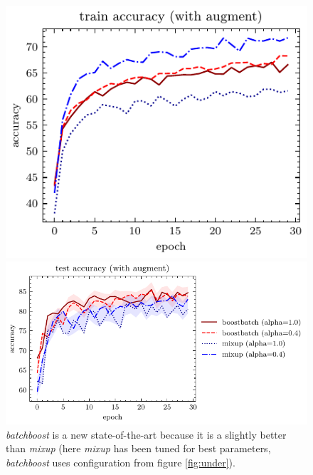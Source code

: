\documentclass{article}
\begin{document}
\begin{figure}[H]
  \centering
\begin{minipage}{.3\textwidth}
  \hspace{-0.65cm}
  \includegraphics[totalheight=5.6cm]{figure-2-train-accuracy-with-augment}
\end{minipage}
\begin{minipage}{.65\textwidth}\vspace{-0.00cm}\hspace{0.865cm}
	\includegraphics[totalheight=5.6cm]{figure-2-test-accuracy-with-augment}
\end{minipage}%
\caption{\emph{batchboost} is a new state-of-the-art because it is a slightly
	better than \emph{mixup} (here \emph{mixup} has been tuned for best
	parameters, \emph{batchboost} uses configuration from figure \ref{fig:under}).}
\label{fig:over}
\end{figure}
\end{document}
